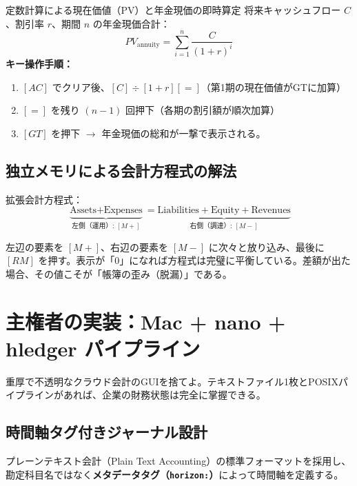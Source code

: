 \documentclass[11pt, a4paper]{report}
\begin{document}
\begin{calcbox}{定数計算による現在価値（PV）と年金現価の即時算定}
将来キャッシュフロー $C$、割引率 $r$、期間 $n$ の年金現価合計：
\begin{equation}
    PV_{\text{annuity}} = \sum_{i=1}^n \frac{C}{(1+r)^i}
\end{equation}
\textbf{キー操作手順：}
\begin{enumerate}
    \item $[AC]$ でクリア後、$[C] \div [1 + r] [=]$（第1期の現在価値がGTに加算）
    \item $[=]$ を残り $(n-1)$ 回押下（各期の割引額が順次加算）
    \item $[GT]$ を押下 $\to$ 年金現価の総和が一撃で表示される。
\end{enumerate}
\end{calcbox}

\section{独立メモリによる会計方程式の解法}

拡張会計方程式：
\begin{equation}
    \underbrace{\text{Assets} + \text{Expenses}}_{\text{左側（運用）: } [M+]} = \underbrace{\text{Liabilities} + \text{Equity} + \text{Revenues}}_{\text{右側（調達）: } [M-]}
\end{equation}

左辺の要素を $[M+]$、右辺の要素を $[M-]$ に次々と放り込み、最後に $[RM]$ を押す。表示が「$0$」になれば方程式は完璧に平衡している。差額が出た場合、その値こそが「帳簿の歪み（脱漏）」である。

\chapter{主権者の実装：Mac + nano + hledger パイプライン}
\label{chap:hledger_implementation}

重厚で不透明なクラウド会計のGUIを捨てよ。テキストファイル1枚とPOSIXパイプラインがあれば、企業の財務状態は完全に掌握できる。

\section{時間軸タグ付きジャーナル設計}

プレーンテキスト会計（Plain Text Accounting）の標準フォーマットを採用し、勘定科目名ではなく\textbf{メタデータタグ（\texttt{horizon:}）}によって時間軸を定義する。
\end{document}
